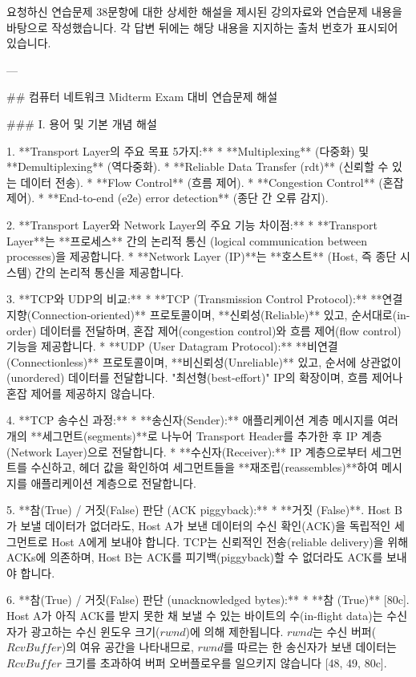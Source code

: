 요청하신 연습문제 38문항에 대한 상세한 해설을 제시된 강의자료와 연습문제 내용을 바탕으로 작성했습니다. 각 답변 뒤에는 해당 내용을 지지하는 출처 번호가 표시되어 있습니다.

---

## 컴퓨터 네트워크 Midterm Exam 대비 연습문제 해설

### I. 용어 및 기본 개념 해설

1.  **Transport Layer의 주요 목표 5가지:**
    *   **Multiplexing** (다중화) 및 **Demultiplexing** (역다중화).
    *   **Reliable Data Transfer (rdt)** (신뢰할 수 있는 데이터 전송).
    *   **Flow Control** (흐름 제어).
    *   **Congestion Control** (혼잡 제어).
    *   **End-to-end (e2e) error detection** (종단 간 오류 감지).

2.  **Transport Layer와 Network Layer의 주요 기능 차이점:**
    *   **Transport Layer**는 **프로세스** 간의 논리적 통신 (logical communication between processes)을 제공합니다.
    *   **Network Layer (IP)**는 **호스트** (Host, 즉 종단 시스템) 간의 논리적 통신을 제공합니다.

3.  **TCP와 UDP의 비교:**
    *   **TCP (Transmission Control Protocol):** **연결 지향(Connection-oriented)** 프로토콜이며, **신뢰성(Reliable)** 있고, 순서대로(in-order) 데이터를 전달하며, 혼잡 제어(congestion control)와 흐름 제어(flow control) 기능을 제공합니다.
    *   **UDP (User Datagram Protocol):** **비연결(Connectionless)** 프로토콜이며, **비신뢰성(Unreliable)** 있고, 순서에 상관없이(unordered) 데이터를 전달합니다. "최선형(best-effort)" IP의 확장이며, 흐름 제어나 혼잡 제어를 제공하지 않습니다.

4.  **TCP 송수신 과정:**
    *   **송신자(Sender):** 애플리케이션 계층 메시지를 여러 개의 **세그먼트(segments)**로 나누어 Transport Header를 추가한 후 IP 계층(Network Layer)으로 전달합니다.
    *   **수신자(Receiver):** IP 계층으로부터 세그먼트를 수신하고, 헤더 값을 확인하여 세그먼트들을 **재조립(reassembles)**하여 메시지를 애플리케이션 계층으로 전달합니다.

5.  **참(True) / 거짓(False) 판단 (ACK piggyback):**
    *   **거짓 (False)**. Host B가 보낼 데이터가 없더라도, Host A가 보낸 데이터의 수신 확인(ACK)을 독립적인 세그먼트로 Host A에게 보내야 합니다. TCP는 신뢰적인 전송(reliable delivery)을 위해 ACKs에 의존하며, Host B는 ACK를 피기백(piggyback)할 수 없더라도 ACK를 보내야 합니다.

6.  **참(True) / 거짓(False) 판단 (unacknowledged bytes):**
    *   **참 (True)** [80c]. Host A가 아직 ACK를 받지 못한 채 보낼 수 있는 바이트의 수(in-flight data)는 수신자가 광고하는 수신 윈도우 크기($rwnd$)에 의해 제한됩니다. $rwnd$는 수신 버퍼($RcvBuffer$)의 여유 공간을 나타내므로, $rwnd$를 따르는 한 송신자가 보낸 데이터는 $RcvBuffer$ 크기를 초과하여 버퍼 오버플로우를 일으키지 않습니다 [48, 49, 80c].

